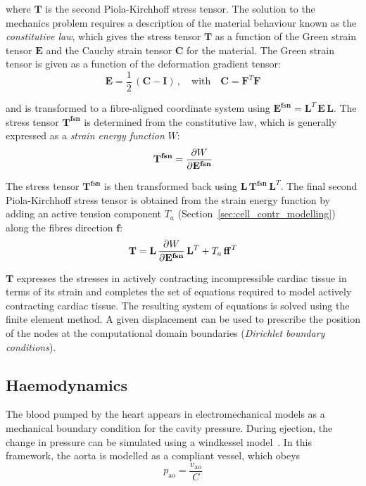 \noindent
where $\mathbf{T}$ is the second Piola-Kirchhoff stress tensor. The solution to the mechanics problem requires a description of the material behaviour known as the \textit{constitutive law}, which gives the stress tensor $\mathbf{T}$ as a function of the Green strain tensor $\mathbf{E}$ and the Cauchy strain tensor $\mathbf{C}$ for the material. The Green strain tensor is given as a function of the deformation gradient tensor:
%
\begin{equation}
    \mathbf{E} = \frac{1}{2}\,(\mathbf{C}-\mathbf{I})\,,\quad\text{with}\quad \mathbf{C}=\mathbf{F}^T\mathbf{F}
\end{equation}

\noindent
and is transformed to a fibre-aligned coordinate system using $\mathbf{E^{fsn}}=\mathbf{L}^T\,\mathbf{E}\,\mathbf{L}$. The stress tensor $\mathbf{T^{fsn}}$ is determined from the constitutive law, which is generally expressed as a \textit{strain energy function} $W$:
%
\begin{equation}
    \mathbf{T^{fsn}} = \dfrac{\partial {W}}{\partial {\mathbf{E^{fsn}}}}
\end{equation}

\noindent
The stress tensor $\mathbf{T^{fsn}}$ is then transformed back using $\mathbf{L}\,\mathbf{T^{fsn}}\,\mathbf{L}^T$. The final second Piola-Kirchhoff stress tensor is obtained from the strain energy function by adding an active tension component $T_a$ (Section~\ref{sec:cell_contr_modelling}) along the fibres direction $\mathbf{f}$:
%
\begin{equation}\label{eq:eqce}
    \mathbf{T} = \mathbf{L}\,\dfrac{\partial {W}}{\partial {\mathbf{E^{fsn}}}}\,\mathbf{L}^T + T_a\,\mathbf{ff}^T
\end{equation}

\noindent
$\mathbf{T}$ expresses the stresses in actively contracting incompressible cardiac tissue in terms of its strain and completes the set of equations required to model actively contracting cardiac tissue. The resulting system of equations is solved using the finite element method. A given displacement can be used to prescribe the position of the nodes at the computational domain boundaries (\textit{Dirichlet boundary conditions}).


%
%
%
\subsection{Haemodynamics}\label{sec:hemodynamics_math_modelling}
The blood pumped by the heart appears in electromechanical models as a mechanical boundary condition for the cavity pressure. During ejection, the change in pressure can be simulated using a windkessel model~\cite{Sagawa:1990}. In this framework, the aorta is modelled as a compliant vessel, which obeys
%
\begin{equation}\label{eq:firstwkelem}
    p_{\textrm{ao}} = \frac{v_{\textrm{ao}}}{C}
\end{equation}

